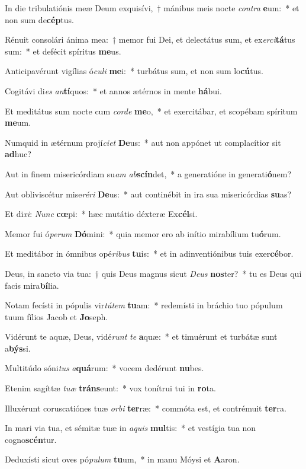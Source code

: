 \item In die tribulatiónis meæ Deum exquisívi,~† mánibus meis nocte \textit{con}\textit{tra} \textbf{e}um:~* et non sum de\textbf{cép}tus.
\item Rénuit consolári ánima mea:~† memor fui Dei, et delectátus sum, et ex\textit{er}\textit{ci}\textbf{tá}tus sum:~* et defécit spíritus \textbf{me}us.
\item Anticipavérunt vigílias ó\textit{cu}\textit{li} \textbf{me}i:~* turbátus sum, et non sum lo\textbf{cú}tus.
\item Cogitávi di\textit{es} \textit{an}\textbf{tí}quos:~* et annos ætérnos in mente \textbf{há}bui.
\item Et meditátus sum nocte cum \textit{cor}\textit{de} \textbf{me}o,~* et exercitábar, et scopébam spíritum \textbf{me}um.
\item Numquid in ætérnum projí\textit{ci}\textit{et} \textbf{De}us:~* aut non appónet ut complacítior sit \textbf{ad}huc?
\item Aut in finem misericórdiam su\textit{am} \textit{ab}\textbf{scín}det,~* a generatióne in generati\textbf{ó}nem?
\item Aut obliviscétur mise\textit{ré}\textit{ri} \textbf{De}us:~* aut continébit in ira sua misericórdias \textbf{su}as?
\item Et di\textit{xi}: \textit{Nunc} \textbf{cœ}pi:~* hæc mutátio déxteræ Ex\textbf{cél}si.
\item Memor fui ó\textit{pe}\textit{rum} \textbf{Dó}mini:~* quia memor ero ab inítio mirabílium tu\textbf{ó}rum.
\item Et meditábor in ómnibus opé\textit{ri}\textit{bus} \textbf{tu}is:~* et in adinventiónibus tuis exer\textbf{cé}bor.
\item Deus, in sancto via tua:~† quis Deus magnus sicut \textit{De}\textit{us} \textbf{nos}ter?~* tu es Deus qui facis mira\textbf{bí}lia.
\item Notam fecísti in pópulis vir\textit{tú}\textit{tem} \textbf{tu}am:~* redemísti in bráchio tuo pópulum tuum fílios Jacob et \textbf{Jo}seph.
\item Vidérunt te aquæ, Deus, vidé\textit{runt} \textit{te} \textbf{a}quæ:~* et timuérunt et turbátæ sunt a\textbf{býs}si.
\item Multitúdo sóni\textit{tus} \textit{a}\textbf{quá}rum:~* vocem dedérunt \textbf{nu}bes.
\item Etenim sagíttæ \textit{tu}\textit{æ} \textbf{tráns}eunt:~* vox tonítrui tui in \textbf{ro}ta.
\item Illuxérunt coruscatiónes tuæ \textit{or}\textit{bi} \textbf{ter}ræ:~* commóta est, et contrémuit \textbf{ter}ra.
\item In mari via tua, et sémitæ tuæ in \textit{a}\textit{quis} \textbf{mul}tis:~* et vestígia tua non cogno\textbf{scén}tur.
\item Deduxísti sicut oves pó\textit{pu}\textit{lum} \textbf{tu}um,~* in manu Móysi et \textbf{A}aron.
